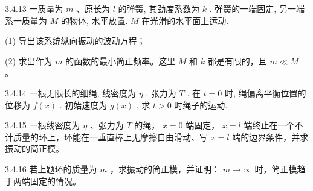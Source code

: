\begin{problem}{3.4.13}
一质量为 $m$ 、原长为 $l$ 的弹簧, 其劲度系数为 $k$ . 弹簧的一端固定, 另一端系一质量为 $M$ 的物体, 水平放置. $M$ 在光滑的水平面上运动.

(1) 导出该系统纵向振动的波动方程；

(2) 求出作为 $m$ 的函数的最小简正频率。这里 $M$ 和 $k$ 都是有限的，且 $m \ll M$ 。
\end{problem}
\clearpage


\begin{problem}{3.4.14}
一根无限长的细绳, 线密度为 $\eta$ , 张力为 $T$ . 在 $t = 0$ 时, 绳偏离平衡位置的位移为 $f(x)$ . 初始速度为 $g(x)$ , 求 $t > 0$ 时绳子的运动.
\end{problem}
\clearpage


\begin{problem}{3.4.15}
一根线密度为 $\eta$ 、张力为 $T$ 的绳， $x = 0$ 端固定， $x = l$ 端终止在一个不计质量的环上，环能在一垂直棒上无摩擦自由滑动、写 $x = l$ 端的边界条件，并求振动的简正模。
\end{problem}
\clearpage


\begin{problem}{3.4.16}
若上题环的质量为 $m$ ，求振动的简正模，并证明： $m \to \infty$ 时，简正模趋于两端固定的情况。
\end{problem}
\clearpage


